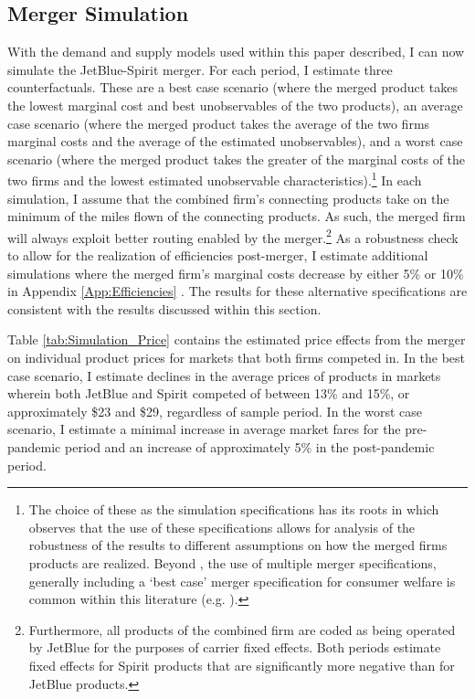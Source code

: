 \documentclass{article}
\begin{document}
	\subsection{Merger Simulation}
	\label{sec:Analysis_Merger}
	With the demand and supply models used within this paper described, I can now simulate the JetBlue-Spirit merger. For each period, I estimate three counterfactuals. These are a best case scenario (where the merged product takes the lowest marginal cost and best unobservables of the two products), an average case scenario (where the merged product takes the average of the two firms marginal costs and the average of the estimated unobservables), and a worst case scenario (where the merged product takes the greater of the marginal costs of the two firms and the lowest estimated unobservable characteristics).\footnote{The choice of these as the simulation specifications has its roots in \citet{ciliberto_market_2021} which observes that the use of these specifications allows for analysis of the robustness of the results to different assumptions on how the merged firms products are realized. Beyond \citet{ciliberto_market_2021}, the use of multiple merger specifications, generally including a `best case' merger specification for consumer welfare is common within this literature (e.g. \citet{li_repositioning_2022}).} In each simulation, I assume that the combined firm's connecting products take on the minimum of the miles flown of the connecting products. As such, the merged firm will always exploit better routing enabled by the merger.\footnote{Furthermore, all products of the combined firm are coded as being operated by JetBlue for the purposes of carrier fixed effects. Both periods estimate fixed effects for Spirit products that are significantly more negative than for JetBlue products.} As a robustness check to allow for the realization of efficiencies post-merger, I estimate additional simulations where the merged firm's marginal costs decrease by either 5\% or 10\% in Appendix \ref{App:Efficiencies} . The results for these alternative specifications are consistent with the results discussed within this section.

     
	Table \ref{tab:Simulation_Price} contains the estimated price effects from the merger on individual product prices for markets that both firms competed in. In the best case scenario, I estimate declines in the average prices of products in markets wherein both JetBlue and Spirit competed of between 13\% and 15\%, or approximately \$23 and \$29, regardless of sample period. In the worst case scenario, I estimate a minimal increase in average market fares for the pre-pandemic period and an increase of approximately 5\% in the post-pandemic period. 
     
\end{document}
